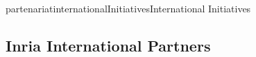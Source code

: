 \documentclass{ra2018}
\begin{document}
\begin{module}{partenariat}{internationalInitiatives}{International Initiatives}












%






\subsection{Inria International Partners}


\end{module}
\end{document}
